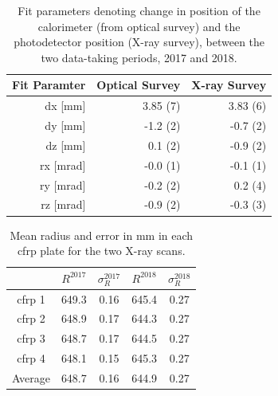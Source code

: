 \begin{table}[h] 
\begin{tabular}{rrr} 
Fit Paramter & Optical Survey &
X-ray Survey \\ 
\hline 
dx [mm] & 3.85 (7)      & 3.83 (6) \\ 
dy [mm] & -1.2 (2)      & -0.7 (2) \\ 
dz [mm] & 0.1 (2)       & -0.9 (2) \\ 
rx [mrad] & -0.0 (1)    & -0.1 (1) \\ 
ry [mrad] & -0.2 (2)    & 0.2 (4)    \\ 
rz [mrad] & -0.9 (2)    &  -0.3 (3)  
\end{tabular}
\caption{Fit parameters denoting change in position of the calorimeter
(from optical survey) and the photodetector position (X-ray survey),
between the two data-taking periods, 2017 and 2018.}
\label{tab:xray2017vs2018} \end{table}



\begin{table}
\begin{tabular}{ccccc}
 & $R^{2017}$ & $\sigma_R^{2017}$ & $R^{2018}$  & $\sigma_R^{2018}$  \\
\hline
cfrp 1 &  649.3 & 0.16 & 645.4 & 0.27 \\
cfrp 2 &  648.9 & 0.17 & 644.3 & 0.27 \\
cfrp 3 &  648.7 & 0.17 & 644.5 & 0.27 \\
cfrp 4 &  648.1 & 0.15 & 645.3 & 0.27 \\
Average&  648.7 & 0.16 & 644.9 & 0.27 \\
\end{tabular}
\caption{Mean radius and error in mm in each cfrp plate for the two X-ray scans.}
\label{tab:radius}
\end{table}


